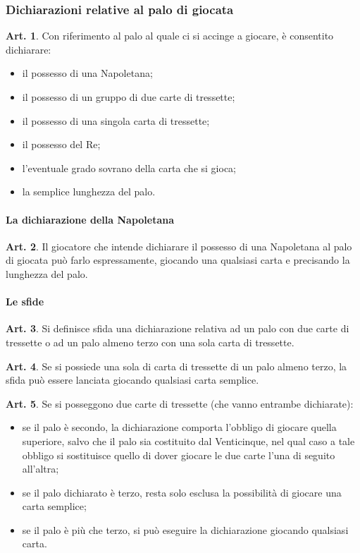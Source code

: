 \documentclass[italian,a4paper]{book}
\theoremstyle{definition}
\newtheorem{art}{Art.}
\newenvironment{packeditem}{
\begin{itemize}
  \setlength{\itemsep}{1pt}
  \setlength{\parskip}{0pt}
  \setlength{\parsep}{0pt}
}{\end{itemize}}
\begin{document}
\subsubsection{Dichiarazioni relative al palo di giocata}
\begin{art}
    Con riferimento al palo al quale ci si accinge a giocare, è consentito dichiarare:
    \begin{packeditem}
\item      il possesso di una Napoletana;
\item      il possesso di un gruppo di due carte di tressette;
\item      il possesso di una singola carta di tressette;
\item      il possesso del Re;
\item      l'eventuale grado sovrano della carta che si gioca;
\item      la semplice lunghezza del palo.
    \end{packeditem}
\end{art}
\paragraph{La dichiarazione della Napoletana}
\begin{art}
    Il giocatore che intende dichiarare il possesso di una Napoletana al palo di giocata può farlo espressamente, giocando una qualsiasi carta e precisando la lunghezza del palo.
\end{art}
\paragraph{Le sfide}
\begin{art}
    Si definisce sfida una dichiarazione relativa ad un palo con due carte di tressette o ad un palo almeno terzo con una sola carta di tressette.
\end{art}
\begin{art}
    Se si possiede una sola di carta di tressette di un palo almeno terzo, la sfida può essere lanciata giocando qualsiasi carta semplice.
\end{art}
\begin{art}
    Se si posseggono due carte di tressette (che vanno entrambe dichiarate):
    \begin{packeditem}
\item se il palo è secondo, la dichiarazione comporta l'obbligo di giocare quella superiore, salvo che il palo sia costituito dal Venticinque, nel qual caso a tale obbligo si sostituisce quello di dover giocare le due carte l'una di seguito all'altra;
\item se il palo dichiarato è terzo, resta solo esclusa la possibilità di giocare una carta semplice;
\item  se il palo è più che terzo, si può eseguire la dichiarazione giocando qualsiasi carta. 
    \end{packeditem}
\end{art}
\end{document}
